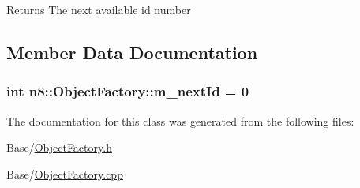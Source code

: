 \begin{DoxyReturn}{Returns}
The next available id number 
\end{DoxyReturn}


\subsection{Member Data Documentation}
\hypertarget{classn8_1_1_object_factory_af9e6c6cb3ab18962dfa4859ceb289923}{
\subsubsection[{m\-\_\-next\-Id}]{\setlength{\rightskip}{0pt plus 5cm}int n8\-::\-Object\-Factory\-::m\-\_\-next\-Id = 0\hspace{0.3cm}{\ttfamily [static]}}}\label{classn8_1_1_object_factory_af9e6c6cb3ab18962dfa4859ceb289923}


The documentation for this class was generated from the following files\-:\begin{DoxyCompactItemize}
\item 
Base/\hyperlink{_object_factory_8h}{Object\-Factory.\-h}\item 
Base/\hyperlink{_object_factory_8cpp}{Object\-Factory.\-cpp}\end{DoxyCompactItemize}
